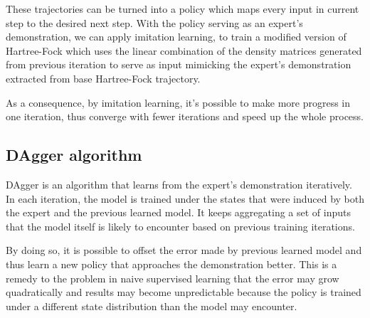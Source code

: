 \documentclass[twoside,11pt]{article}
\begin{document}
These trajectories can be turned into a policy which maps every input in current step to the desired next step. With the policy serving as an expert's demonstration, we can apply imitation learning, to train a modified version of Hartree-Fock which uses the linear combination of the density matrices generated from previous iteration to serve as input mimicking the expert's demonstration extracted from base Hartree-Fock trajectory.

As a consequence, by imitation learning, it's possible to make more progress in one iteration, thus converge with fewer iterations and speed up the whole process.  







\subsection{DAgger algorithm}
DAgger is an algorithm that learns from the expert's demonstration iteratively. In each iteration, the model is trained under the states that were induced by both the expert and the previous learned model. It keeps aggregating a set of inputs that the model itself is likely to encounter based on previous training iterations.  

By doing so, it is possible to offset the error made by previous learned model and thus learn a new policy that approaches the demonstration better. This is a remedy to the problem in naive supervised learning that the error may grow quadratically and results may become unpredictable because the policy is trained under a different state distribution than the model may encounter. 
\end{document}
